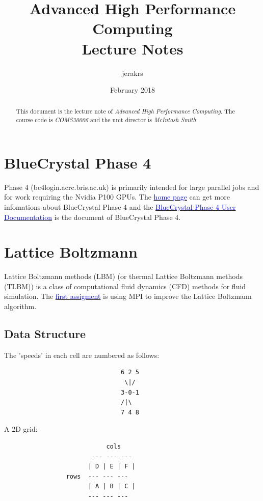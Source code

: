 \documentclass{article}
\title{%
    Advanced High Performance Computing \\
    \vspace{0.4cm}
    \large Lecture Notes
}
\author{jerakrs}
\date{February 2018}
\begin{document}
\maketitle

\begin{abstract}
    This document is the lecture note of \textit{Advanced High Performance Computing}. The course code is \textit{COMS30006} and the unit director is \textit{McIntosh Smith}.
\end{abstract}


\section{BlueCrystal Phase 4}

Phase 4 (bc4login.acrc.bris.ac.uk) is primarily intended for large parallel jobs and for work requiring the Nvidia P100 GPUs. The \href{https://www.acrc.bris.ac.uk/acrc/index.htm}{\textcolor{blue}{home page}} can get more infomations about BlueCrystal Phase 4 and the
 \href{https://www.acrc.bris.ac.uk/protected/bc4-docs/index.html}{\textcolor{blue}{BlueCrystal Phase 4 User Documentation}} is the document of BlueCrystal Phase 4.


\section{Lattice Boltzmann}

Lattice Boltzmann methods (LBM) (or thermal Lattice Boltzmann methods (TLBM)) is a class of computational fluid dynamics (CFD) methods for fluid simulation. The \href{https://github.com/UoB-HPC/advanced-hpc-lbm}{\textcolor{blue}{first assigment}} is using MPI to improve the Lattice Boltzmann algorithm.


\subsection{Data Structure}

The 'speeds' in each cell are numbered as follows:
\begin{lstlisting}
                                6 2 5
                                 \|/
                                3-0-1
                                /|\
                                7 4 8
\end{lstlisting}

A 2D grid:
\begin{lstlisting}
                            cols
                        --- --- ---
                       | D | E | F |
                 rows  --- --- ---
                       | A | B | C |
                       --- --- ---
\end{lstlisting}
\end{document}
